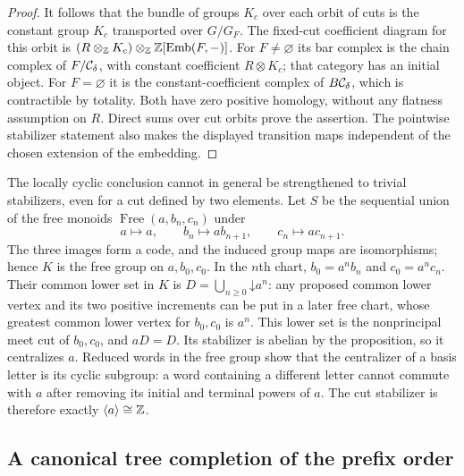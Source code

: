 \begin{proof}
It follows that the bundle of groups $K_c$ over each orbit of
cuts is the constant group $K_c$ transported over $G/G_F$.
The fixed-cut coefficient diagram for this orbit is
$(R\otimes_{\mathbb Z}K_c)\otimes_{\mathbb Z}\mathbb Z[\operatorname{Emb}(F,-)]$.
For $F\ne\varnothing$ its bar complex is the chain complex
of $F/\mathcal C_\delta$, with constant coefficient $R\otimes K_c$;
that category has an initial object. For $F=\varnothing$ it
is the constant-coefficient complex of $B\mathcal C_\delta$, which is
contractible by totality. Both have zero positive homology,
without any flatness assumption on $R$. Direct sums over cut
orbits prove the assertion. The pointwise stabilizer statement
also makes the displayed transition maps independent of the
chosen extension of the embedding.
\end{proof}

The locally cyclic conclusion cannot in general be strengthened
to trivial stabilizers, even for a cut defined by two elements.
Let $S$ be the sequential union of the free monoids
$\operatorname{Free}(a,b_n,c_n)$ under
\[
 a\longmapsto a,\qquad
 b_n\longmapsto a b_{n+1},\qquad
 c_n\longmapsto a c_{n+1}.
\]
The three images form a code, and the induced group maps
are isomorphisms; hence $K$ is the free group on $a,b_0,c_0$.
In the $n$th chart, $b_0=a^n b_n$ and $c_0=a^n c_n$.
Their common lower set in $K$ is
$D=\bigcup_{n\ge0}\mathord\downarrow a^n$: any proposed common
lower vertex and its two positive increments can be put in a
later free chart, whose greatest common lower vertex for
$b_0,c_0$ is $a^n$.
This lower set is the nonprincipal meet cut of $b_0,c_0$,
and $aD=D$. Its stabilizer is abelian by the proposition,
so it centralizes $a$. Reduced words in the free group show
that the centralizer of a basis letter is its cyclic subgroup:
a word containing a different letter cannot commute with $a$
after removing its initial and terminal powers of $a$.
The cut stabilizer is therefore exactly $\langle a\rangle\cong\mathbb Z$.

\subsection{A canonical tree completion of the prefix order}

